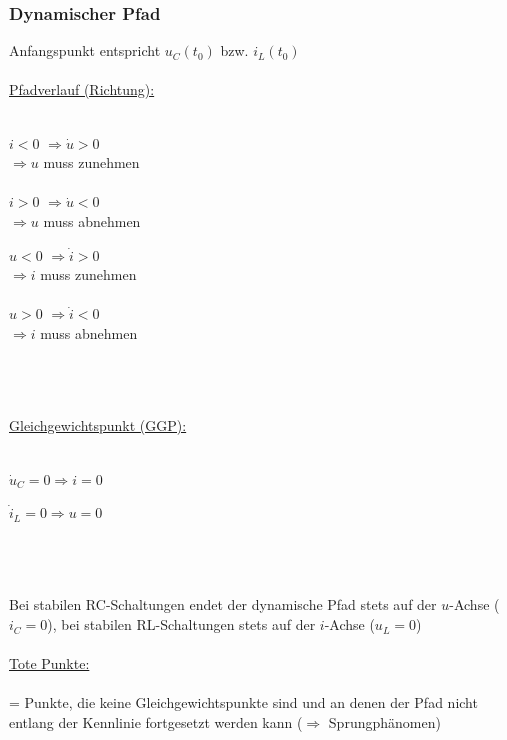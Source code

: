 \documentclass[a4paper,twocolumn,10pt]{article}
\begin{document}
\subsubsection*{Dynamischer Pfad}
Anfangspunkt entspricht $u_C(t_0)$ bzw. $i_L(t_0)$\\\\
\underline{Pfadverlauf (Richtung):}\\\\
\begin{minipage}[t]{0.23\textwidth}
\underline{$i<0$} $\Rightarrow \dot u>0$\\
$\Rightarrow u$ muss zunehmen\\\\
\underline{$i>0$} $\Rightarrow \dot u<0$\\
$\Rightarrow u$ muss abnehmen
\end{minipage}
\hfill
\begin{minipage}[t]{0.23\textwidth}
\underline{$u<0$} $\Rightarrow \dot i>0$\\
$\Rightarrow i$ muss zunehmen\\\\
\underline{$u>0$} $\Rightarrow \dot i<0$\\
$\Rightarrow i$ muss abnehmen
\end{minipage}\\\\\\
\underline{Gleichgewichtspunkt (GGP):}\\\\
\begin{minipage}[t]{0.23\textwidth}
$\dot u_C=0 \Rightarrow i=0$
\end{minipage}
\hfill
\begin{minipage}[t]{0.23\textwidth}
$\dot i_L=0 \Rightarrow u=0$
\end{minipage}\\\\\\
Bei stabilen RC-Schaltungen endet der dynamische Pfad stets auf der $u$-Achse ($i_C=0$), bei stabilen RL-Schaltungen stets auf der $i$-Achse ($u_L=0$)\\\\
\underline{Tote Punkte:}\\\\
= Punkte, die keine Gleichgewichtspunkte sind und an denen der Pfad nicht entlang der Kennlinie fortgesetzt werden kann
($\Rightarrow$ Sprungphänomen)
\end{document}
